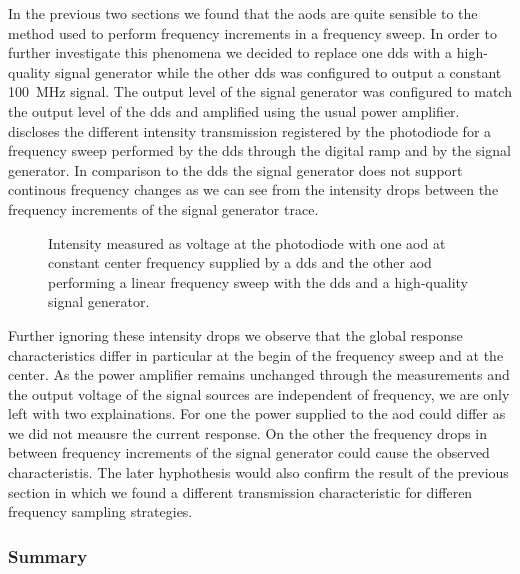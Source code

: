 In the previous two sections we found that the \gls{aod}s are quite sensible
to the method used to perform frequency increments in a frequency sweep. In
order to further investigate this phenomena we decided to replace one
\gls{dds} with a high-quality signal generator while the other \gls{dds} was
configured to output a constant \SI{100}{\mega\hertz} signal. The output
level of the signal generator was configured to match the output level of
the \gls{dds} and amplified using the usual power amplifier.
 discloses the different
intensity transmission registered by the photodiode for a frequency sweep
performed by the \gls{dds} through the digital ramp and by the signal
generator. In comparison to the \gls{dds} the signal generator does not
support continous frequency changes as we can see from the intensity drops
between the frequency increments of the signal generator trace.
\begin{figure}[htb]
  \centering
  \begin{adjustbox}{width=\textwidth}
  \end{adjustbox}
  \caption{Intensity measured as voltage at the photodiode with one \gls{aod}
    at constant center frequency supplied by a \gls{dds} and the other
    \gls{aod} performing a linear frequency sweep with the \gls{dds} and a
    high-quality signal generator.
  }\label{fig:intensity_distribution_signal_sources}
\end{figure}
Further ignoring these intensity drops we observe that the global response
characteristics differ in particular at the begin of the frequency sweep and
at the center. As the power amplifier remains unchanged through the
measurements and the output voltage of the signal sources are independent of
frequency, we are only left with two explainations. For one the power supplied
to the \gls{aod} could differ as we did not meausre the current response. On
the other the frequency drops in between frequency increments of the signal
generator could cause the observed characteristis. The later hyphothesis would
also confirm the result of the previous section in which we found a different
transmission characteristic for differen frequency sampling strategies.

\subsubsection{Summary}

